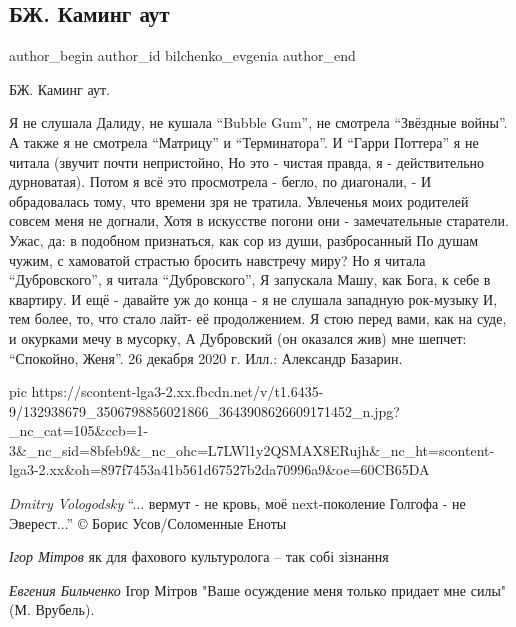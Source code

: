  
 
 
 
 
 
\subsection{БЖ. Каминг аут}
\label{sec:27_12_2020.fb.bilchenko_evgenia.6.kaming_aut}
\ifcmt
 author_begin
   author_id bilchenko_evgenia
 author_end
\fi

БЖ. Каминг аут.

Я не слушала Далиду, не кушала \enquote{Bubble Gum}, не смотрела \enquote{Звёздные войны}.
А также я не смотрела \enquote{Матрицу} и \enquote{Терминатора}.
И \enquote{Гарри Поттера} я не читала (звучит почти непристойно,
Но это - чистая правда, я - действительно дурноватая).
Потом я всё это просмотрела - бегло, по диагонали, -
И обрадовалась тому, что времени зря не тратила.
Увлеченья моих родителей совсем меня не догнали,
Хотя в искусстве погони они - замечательные старатели.
Ужас, да: в подобном признаться, как сор из души, разбросанный
По душам чужим, с хамоватой страстью бросить навстречу миру?
Но я читала \enquote{Дубровского}, я читала \enquote{Дубровского},
Я запускала Машу, как Бога, к себе в квартиру.
И ещё - давайте уж до конца - я не слушала западную рок-музыку
И, тем более, то, что стало лайт- её продолжением.
Я стою перед вами, как на суде, и окурками мечу в мусорку,
А Дубровский (он оказался жив) мне шепчет: \enquote{Спокойно, Женя}.
26 декабря 2020 г.
Илл.: Александр Базарин.

\ifcmt
  pic https://scontent-lga3-2.xx.fbcdn.net/v/t1.6435-9/132938679_3506798856021866_3643908626609171452_n.jpg?_nc_cat=105&ccb=1-3&_nc_sid=8bfeb9&_nc_ohc=L7LWl1y2QSMAX8ERujh&_nc_ht=scontent-lga3-2.xx&oh=897f7453a41b561d67527b2da70996a9&oe=60CB65DA
\fi

\emph{Dmitry Vologodsky}
\enquote{... вермут - не кровь, моё next-поколение
Голгофа - не Эверест...}
© Борис Усов/Соломенные Еноты

\emph{Ігор Мітров}
як для фахового культуролога – так собі зізнання

\emph{Евгения Бильченко}
Ігор Мітров "Ваше осуждение меня только придает мне силы" (М. Врубель).
